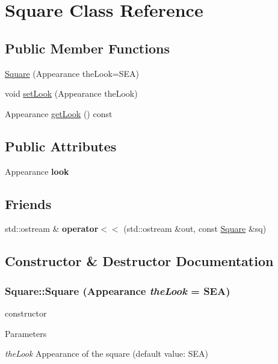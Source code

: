 \hypertarget{struct_square}{
\section{Square Class Reference}
\label{struct_square}
}
\subsection*{Public Member Functions}
\begin{DoxyCompactItemize}
\item 
\hyperlink{struct_square_a7c671288d3e375007f4b56dd8e34460d}{Square} (Appearance theLook=SEA)
\item 
void \hyperlink{struct_square_ae8c3835149a39ecbaaf5e7feb6847546}{setLook} (Appearance theLook)
\item 
Appearance \hyperlink{struct_square_ab83572f208f397010d57337b682bf689}{getLook} () const 
\end{DoxyCompactItemize}
\subsection*{Public Attributes}
\begin{DoxyCompactItemize}
\item 
\hypertarget{struct_square_acdec971291e905a2c4cba3a00304a27e}{
Appearance {\bfseries look}}
\label{struct_square_acdec971291e905a2c4cba3a00304a27e}

\end{DoxyCompactItemize}
\subsection*{Friends}
\begin{DoxyCompactItemize}
\item 
\hypertarget{struct_square_a4c027befebf85c33c607b0c6f3467c6d}{
std::ostream \& {\bfseries operator$<$$<$} (std::ostream \&out, const \hyperlink{struct_square}{Square} \&sq)}
\label{struct_square_a4c027befebf85c33c607b0c6f3467c6d}

\end{DoxyCompactItemize}


\subsection{Constructor \& Destructor Documentation}
\hypertarget{struct_square_a7c671288d3e375007f4b56dd8e34460d}{
\subsubsection[{Square}]{\setlength{\rightskip}{0pt plus 5cm}Square::Square (Appearance {\em theLook} = {\ttfamily SEA})}}
\label{struct_square_a7c671288d3e375007f4b56dd8e34460d}
constructor 
\begin{DoxyParams}{Parameters}
\item[{\em theLook}]Appearance of the square (default value: SEA) \end{DoxyParams}


